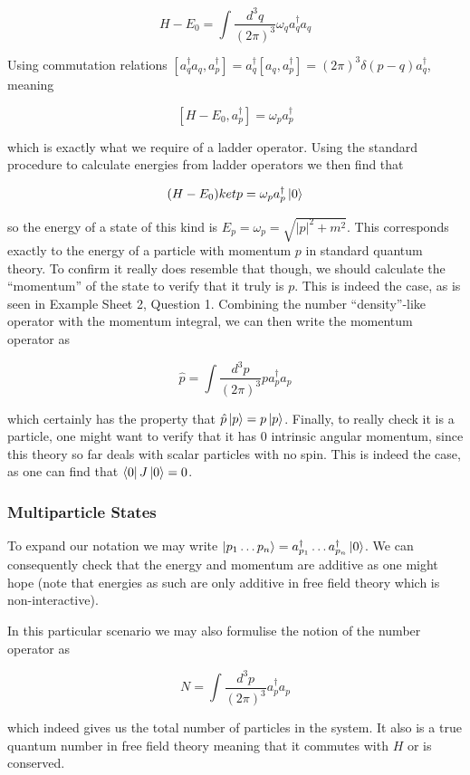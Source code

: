\documentclass{article}
\theoremstyle{definition}
\begin{document}
$$ H - E_0 = \int \frac{d^3q}{(2\pi)^3} \omega_q a^\dagger_q a_q $$

Using commutation relations $[a_q^\dagger a_q, a^\dagger_p] = a^\dagger_q[a_q,
a_p^\dagger] = (2\pi)^3 \delta(p - q)a^\dagger_q$, meaning 

$$ [H - E_0, a_p^\dagger] = \omega_p a^\dagger_p $$

which is exactly what we require of a ladder operator. Using the standard
procedure to calculate energies from ladder operators we then find that

$$ (H - E_0) ket{p} = \omega_p a^\dagger_p \ket{0} $$

so the energy of a state of this kind is $E_p = \omega_p = \sqrt{|p|^2 + m^2}$.
This corresponds exactly to the energy of a particle with momentum $p$ in
standard quantum theory. To confirm it really does resemble that though, we
should calculate the ``momentum'' of the state to verify that it truly is $p$.
This is indeed the case, as is seen in Example Sheet 2, Question 1. 
Combining the number ``density''-like operator with the momentum integral, we
can then write the momentum operator as 

$$ \hat{p} = \int \frac{d^3p}{(2\pi)^3} p a_p^\dagger a_p $$

which certainly has the property that $\hat{p} \ket{p} = p \ket{p}$. Finally, to
really check it is a particle, one might want to verify that it has 0 intrinsic
angular momentum, since this theory so far deals with scalar particles with no
spin. This is indeed the case, as one can find that $\bra{0} J \ket{0} = 0$.

\subsubsection{Multiparticle States}

To expand our notation we may write $\ket{p_1 \dots p_n} = a_{p_1}^\dagger \dots
a_{p_n}^\dagger \ket{0}$. We can consequently check that the energy and
momentum are additive as one might hope (note that energies as such are only
additive in free field theory which is non-interactive). 

In this particular scenario we may also formulise the notion of the number
operator as 

$$ N = \int \frac{d^3p}{(2\pi)^3} a_p^\dagger a_p $$

which indeed gives us the total number of particles in the system. It also is a
true quantum number in free field theory meaning that it commutes with $H$ or is
conserved.
\end{document}
